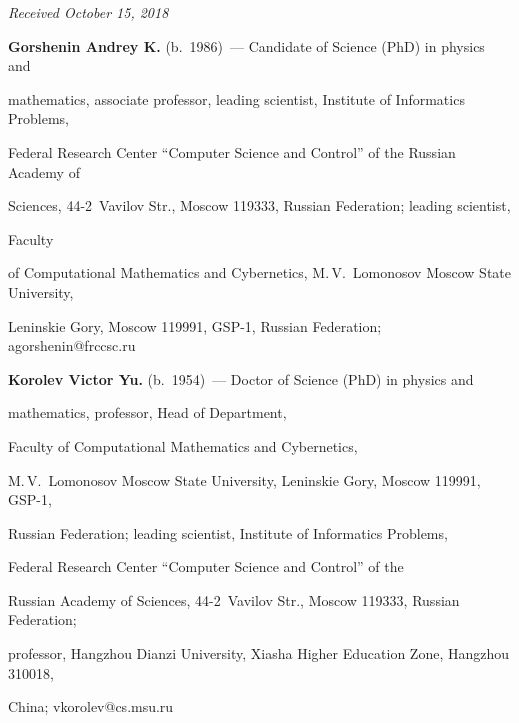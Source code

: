 \vspace*{-6pt}





\hfill{\small\textit{Received October 15, 2018}}





















\Contr





\noindent


\textbf{Gorshenin Andrey K.} (b.\ 1986)~--- Candidate of Science (PhD) in physics and


mathematics, associate professor, leading scientist, Institute of Informatics Problems,


Federal Research Center ``Computer Science and Control'' of the Russian Academy of


Sciences, 44-2~Vavilov Str., Moscow 119333, Russian Federation;  leading scientist, 


Faculty


of Computational Mathematics and Cybernetics, M.\,V.~Lomonosov Moscow State University, 


 Leninskie Gory,  Moscow 119991,  GSP-1, Russian Federation; \mbox{agorshenin@frccsc.ru}





\vspace*{3pt}





\noindent


\textbf{Korolev Victor Yu.} (b.\ 1954)~--- Doctor of Science (PhD) in physics and


mathematics, professor, Head of Department, 


Faculty of Computational Mathematics and Cybernetics, 


M.\,V.~Lomonosov Moscow State University,  Leninskie Gory,  Moscow 119991,  GSP-1,


Russian Federation; leading scientist, Institute of Informatics Problems, 


Federal Research Center ``Computer Science and Control'' of the 


Russian Academy of Sciences, 44-2~Vavilov Str., Moscow 119333, Russian Federation; 


professor, Hangzhou Dianzi University, Xiasha Higher Education Zone, Hangzhou 310018, 


China; \mbox{vkorolev@cs.msu.ru}


\label{end\stat}





\renewcommand{\bibname}{\protect\rm Литература}    


